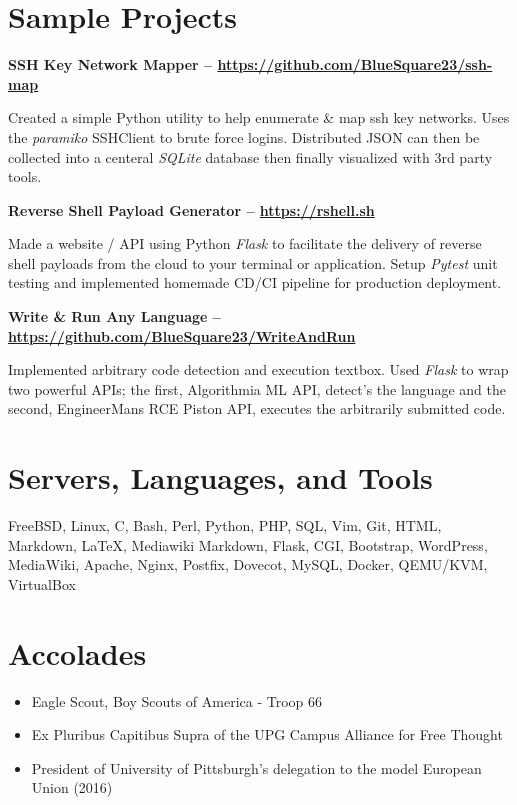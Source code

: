 \documentclass{article}
\begin{document}
\section{Sample Projects}

\noindent
\textbf{SSH Key Network Mapper -- \url{https://github.com/BlueSquare23/ssh-map}}

Created a simple Python utility to help enumerate \& map ssh key networks. Uses
the \emph{paramiko} SSHClient to brute force logins.  Distributed JSON can then
be collected into a centeral \emph{SQLite} database then finally visualized
with 3rd party tools.

\noindent
\textbf{Reverse Shell Payload Generator -- \url{https://rshell.sh}}

Made a website / API using Python \emph{Flask} to facilitate the delivery of
reverse shell payloads from the cloud to your terminal or application. Setup
\emph{Pytest} unit testing and implemented homemade CD/CI pipeline for
production deployment.

\noindent
\textbf{Write \& Run Any Language -- \url{https://github.com/BlueSquare23/WriteAndRun}}

Implemented arbitrary code detection and execution textbox. Used \emph{Flask}
to wrap two powerful APIs; the first, Algorithmia ML API, detect's the language
and the second, EngineerMans RCE Piston API, executes the arbitrarily submitted
code.

\section{Servers, Languages, and Tools}

FreeBSD, Linux, C, Bash, Perl, Python, PHP, SQL, Vim, Git, HTML, Markdown,
{\LaTeX}, Mediawiki Markdown, Flask, CGI, Bootstrap, WordPress, MediaWiki,
Apache, Nginx, Postfix, Dovecot, MySQL, Docker, QEMU/KVM, VirtualBox 

\section{Accolades}

\begin{itemize}
\itemsep0em

\item Eagle Scout, Boy Scouts of America - Troop 66

\item Ex Pluribus Capitibus Supra of the UPG Campus Alliance for Free Thought

\item President of University of Pittsburgh's delegation to the model European Union (2016)
\end{itemize}
\end{document}
